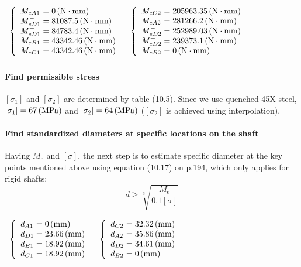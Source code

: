 \begin{tabular}{p{7cm}p{7cm}}
	$
	\left\{ 
	\begin{array}{l@{{} = {}}l}
	M_{eA1} & 0 \unit{(N\cdot mm)}\\
	M_{eD1}^- & 81087.5 \unit{(N\cdot mm)}\\
	M_{eD1}^+ & 84783.4 \unit{(N\cdot mm)}\\
	M_{eB1} & 43342.46 \unit{(N\cdot mm)}\\
	M_{eC1} & 43342.46 \unit{(N\cdot mm)}\\
	\end{array}
	\right.
	$ &
	$
	\left\{ 
	\begin{array}{l@{{} = {}}l}
	M_{eC2} & 205963.35 \unit{(N\cdot mm)}\\
	M_{eA2} & 281266.2 \unit{(N\cdot mm)}\\
	M_{eD2}^- & 252989.03 \unit{(N\cdot mm)}\\
	M_{eD2}^+ & 239373.1 \unit{(N\cdot mm)}\\
	M_{eB2} & 0 \unit{(N\cdot mm)}\\
	\end{array}
	\right.
	$
\end{tabular}\vskip2mm

\paragraph{Find permissible stress}
$ [\sigma_1] $ and $ [\sigma_2] $ are determined by table (10.5). Since we use quenched 45X steel, $ [\sigma_1] = 67 \, (\mathrm{MPa})$ and $ [\sigma_2] = 64 \, (\mathrm{MPa})$ ($ [\sigma_2] $ is achieved using interpolation).

\paragraph{Find standardized diameters at specific locations on the shaft} Having $ M_e $ and $ [\sigma] $, the next step is to estimate specific diameter at the key points mentioned above using equation (10.17) on p.194, which only applies for rigid shafts:
\[d \geq \sqrt[3]{\dfrac{M_e}{0.1[\sigma]}}\]

\begin{tabular}{p{7cm}p{7cm}}
	$
	\left\{ 
	\begin{array}{l@{{} = {}}l}
	d_{A1} & 0 \unitp{mm}\\
	d_{D1} & 23.66 \unitp{mm}\\
	d_{B1} & 18.92 \unitp{mm}\\
	d_{C1} & 18.92 \unitp{mm}\\
	\end{array}
	\right.
	$ &
	$
	\left\{ 
	\begin{array}{l@{{} = {}}l}
	d_{C2} & 32.32 \unitp{mm}\\
	d_{A2} & 35.86 \unitp{mm}\\
	d_{D2} & 34.61 \unitp{mm}\\
	d_{B2} & 0\unitp{mm}\\
	\end{array}
	\right.
	$
\end{tabular}

